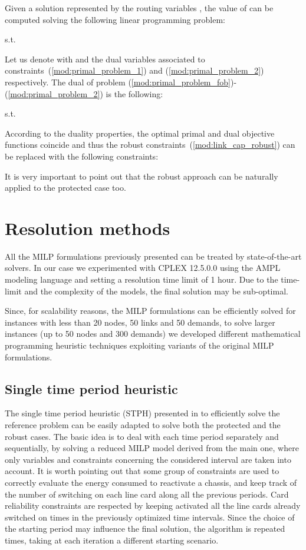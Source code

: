 \documentclass[final,5p,times,twocolumn]{elsarticle}
\begin{document}
Given a solution represented by the routing variables , the value of  can be computed  solving the  following  linear programming problem:


{s.t.}   


Let us denote with  and  the dual variables associated to constraints~(\ref{mod:primal_problem_1}) and (\ref{mod:primal_problem_2})  respectively. The dual of problem (\ref{mod:primal_problem_fob})-(\ref{mod:primal_problem_2}) is the following:

{s.t.}



According to the duality properties, the optimal primal and dual objective functions coincide and thus  the  robust constraints~(\ref{mod:link_cap_robust})  can be replaced with the following constraints:




It is very important to point out that the robust approach can be naturally applied to the protected case too. 

\section{Resolution methods}\label{sec:methods}
All the MILP formulations previously presented can be treated by  state-of-the-art solvers. 
In our case we experimented with CPLEX 12.5.0.0 using the AMPL modeling language and setting a resolution time limit of 1 hour. Due to the time-limit and the complexity of the models, the final solution may be sub-optimal. 

Since, for scalability reasons, the MILP formulations can be efficiently solved for instances with less than 20 nodes, 50 links and 50 demands, to solve larger instances (up to 50 nodes and 300 demands) we developed different mathematical programming heuristic techniques exploiting variants of the original MILP formulations. 

\subsection{Single time period heuristic}
The single time period heuristic (STPH) presented in \cite{addis13a} to efficiently solve the reference problem can be easily adapted to solve both the protected and the robust cases. The basic idea is to deal with each time period separately and sequentially, by solving a reduced MILP model derived from the main one, where only variables and constraints concerning the considered interval are taken into account. It is worth pointing out that some group of constraints are used to correctly evaluate the energy consumed to reactivate a chassis, and keep track of the number of switching on  each line card along all the previous periods. Card reliability constraints are respected by keeping activated all the line cards already switched on  times in the previously optimized time intervals. Since the choice of the starting period may influence the final solution, the algorithm is repeated  times, taking at each iteration a different starting scenario.
\end{document}
